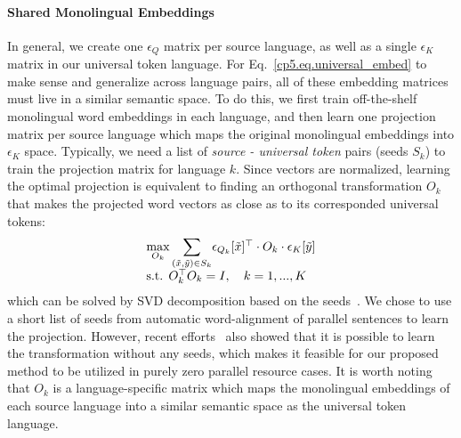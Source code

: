 

\paragraph{Shared Monolingual Embeddings}
In general, we create one $\epsilon_Q$ matrix per source language, as well as a single $\epsilon_K$ matrix in our universal token language. For Eq.~\eqref{cp5.eq.universal_embed} to make sense and generalize across language pairs, all of these embedding matrices must live in a similar semantic space. To do this, we first train off-the-shelf monolingual word embeddings in each language, and then learn one projection matrix per source language which maps the original monolingual embeddings into $\epsilon_K$ space.
Typically, we need a list of \textit{source - universal token} pairs (seeds $S_k$) to train the projection matrix for language $k$. Since vectors are normalized, learning the optimal projection is equivalent to finding an orthogonal transformation $O_k$ that makes the projected word vectors as close as to its corresponded universal tokens:
\begin{equation}
  \begin{array}{l}  
         \max\limits_{O_k}\mathlarger{\sum}\limits_{(\tilde{x}, \tilde{y})\in S_k}  \epsilon_{Q_k}[\tilde{x}]^\top \cdot O_k \cdot \epsilon_K[\tilde{y}] \\  
         \text{s.t.       } O_k^\top O_k = I, \ \ \ k=1, ..., K
 \end{array}  
\end{equation}
which can be solved by SVD decomposition based on the seeds~\cite{smith2017offline}. We chose to use a short list of seeds from automatic word-alignment of parallel sentences  to learn the projection. However, recent efforts~\cite{Artetxe2017LearningBW,Conneau2017WordTW}   also showed that it is possible to learn the transformation without any seeds, which makes it feasible  for our  proposed method to be utilized in purely zero parallel resource cases.
It is worth noting that  $O_k$ is a language-specific matrix which maps the monolingual embeddings of each source language into a similar semantic space as the universal token language.

